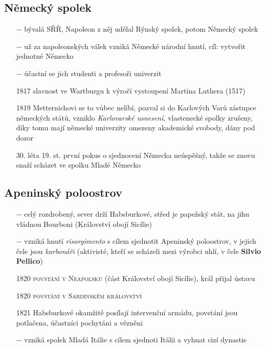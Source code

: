 \documentclass{article}
\begin{document}
\subsection*{Německý spolek}
\begin{itemize}
    \vspace{-0.5em}
    \setlength\itemsep{0.15em}
    \item[$-$] bývalá SŘŘ, Napoleon z něj udělal Rýnský spolek, potom Německý spolek
    \item[$-$] už za napoleonských válek vzniká Německé národní hnutí, cíl: vytvořit jednotné Německo
    \item[$-$] účastní se jich studenti a profesoři univerzit
    \item[1817] slavnost ve Wartburgu k výročí vystoupení Martina Luthera (1517)
    \item[1819] Metternichovi se to vůbec nelíbí, pozval si do Karlových Varů zástupce německých států, vzniklo \textit{Karlovarské usnesení}, vlastenecké spolky zrušeny, díky tomu mají německé univerzity omezeny akademické svobody, dány pod dozor
    \item[30. léta 19. st.] první pokus o sjednocení Německa neúspěšný, takže se znovu snaží scházet ve spolku Mladé Německo
\end{itemize}

\subsection*{Apeninský poloostrov}
\begin{itemize}
    \vspace{-0.5em}
    \setlength\itemsep{0.15em}
    \item[$-$] celý rozdrobený, sever drží Habsburkové, střed je papežský stát, na jihu vládnou Bourboni (Království obojí Sicílie)
    \item[$-$] vzniká hnutí \textit{risorgimento} s cílem sjednotit Apeninský poloostrov, v jejich čele jsou \textit{karbonáři} (aktivisté, kteří se scházeli mezi výrobci uhlí, v čele \textbf{Silvio Pellico})
    \item[1820] \textsc{povstání v Neapolsku} (část Království obojí Sicílie), král přijal ústavu
    \item[1820] \textsc{povstání v Sardinském království}
    \item[1821] Habsburkové okamžitě posílají intervenční armádu, povstání jsou potlačena, účastníci pochytáni a vězněni
    \item[$-$] vzniká spolek Mladá Itálie s cílem sjednoti Itálii a vyhnat cizí dynastie
\end{itemize}
\end{document}
